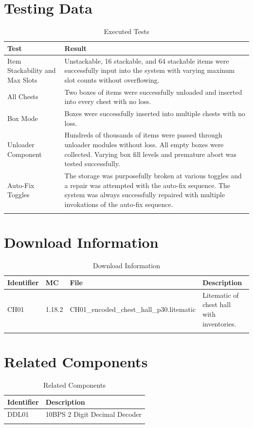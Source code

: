 \documentclass[10pt]{datasheet}
\begin{document}
\section{Testing Data}

\begin{table}[h]
\caption{Executed Tests}
\begin{tabularx}{\textwidth}{l | X}
    \thickhline
    \textbf{Test} & \textbf{Result} \\
    \hline
    Item Stackability and Max Slots & Unstackable, 16 stackable, and 64 stackable items were successfully input into the system with varying maxinum slot counts without overflowing.\\
    \hline
    All Chests & Two boxes of items were successfully unloaded and inserted into every chest with no loss.\\
    \hline
    Box Mode & Boxes were successfully inserted into multiple chests with no loss.\\
    \hline
    Unloader Component & Hundreds of thousands of items were passed through unloader modules without loss. All empty boxes were collected. Varying box fill levels and premature abort was tested successfully.\\
    \hline
    Auto-Fix Toggles & The storage was purposefully broken at various toggles and a repair was attempted with the auto-fix sequence. The system was always successfully repaired with multiple invokations of the auto-fix sequence.\\
    \thickhline
\end{tabularx}
\end{table}

\section{Download Information}
\begin{table}[h]
    \caption{Download Information}
    \begin{tabularx}{\textwidth}{l | l | l | X}
        \thickhline
        \textbf{Identifier} & \textbf{MC} & \textbf{File} & \textbf{Description} \\
        \hline
        CH01 & 1.18.2 & CH01\_encoded\_chest\_hall\_p30.litematic & Litematic of chest hall with inventories. \\
        \thickhline
    \end{tabularx}
\end{table}

\newpage
\section{Related Components}
\begin{table}[h]
    \caption{Related Components}
    \begin{tabularx}{\textwidth}{ l | l }
        \thickhline
        \textbf{Identifier} & \textbf{Description} \\
        \hline
        DDL01 & 10BPS 2 Digit Decimal Decoder \\
        \thickhline
    \end{tabularx}
\end{table}
\end{document}

